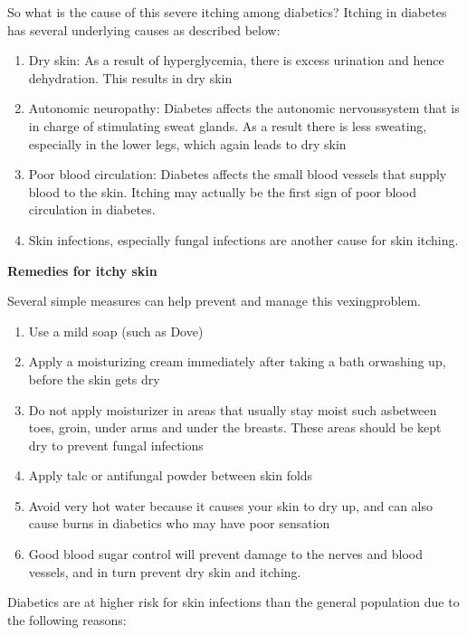 So what is the cause of this severe itching among diabetics? Itching in diabetes has several underlying causes as described below:
\begin{enumerate}[•]
\itemsep=0pt
\item Dry skin: As a result of hyperglycemia, there is excess urination and hence dehydration. This results in dry skin
\item Autonomic neuropathy: Diabetes affects the autonomic nervous\break system that is in charge of stimulating sweat glands. As a result there is less sweating, especially in the lower legs, which again leads to dry skin
\item Poor blood circulation: Diabetes affects the small blood vessels that supply blood to the skin. Itching may actually be the first sign of poor blood circulation in diabetes.
\item Skin infections, especially fungal infections are another cause for skin itching.
\end{enumerate}

\noindent\textbf{Remedies for itchy skin}

\noindent Several simple measures can help prevent and manage this vexing\break problem.

\begin{enumerate}[•]
\itemsep=0pt
\item Use a mild soap (such as Dove)
\item Apply a moisturizing cream immediately after taking a bath or\break washing up, before the skin gets dry
\item Do not apply moisturizer in areas that usually stay moist such as\break between toes, groin, under arms and under the breasts. These areas should be kept dry to prevent fungal infections
\item Apply talc or antifungal powder between skin folds
\item Avoid very hot water because it causes your skin to dry up, and can also cause burns in diabetics who may have poor sensation
\item Good blood sugar control will prevent damage to the nerves and blood vessels, and in turn prevent dry skin and itching.
\end{enumerate}


Diabetics are at higher risk for skin infections than the general popu\-lation due to the following reasons:

